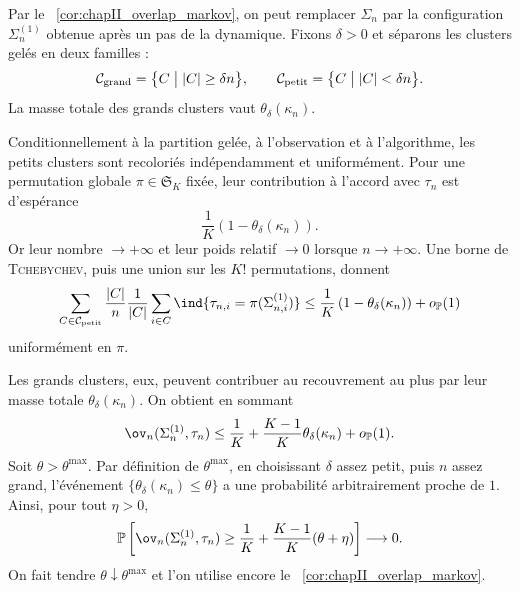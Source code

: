 \begin{Preuve}
Par le \Cor~\ref{cor:chapII_overlap_markov}, on peut remplacer $\Sigma_n$ par la configuration $\Sigma_n^{(1)}$ obtenue après un pas de la dynamique. Fixons $\delta>0$ et séparons les clusters gelés en deux familles :
\[
    \mathcal C_{\mathrm{grand}}=\bigl\{C \bigm| |C|\ge \delta n\bigr\},
    \qquad
    \mathcal C_{\mathrm{petit}}=\bigl\{C \bigm| |C|<\delta n\bigr\}.
\]
La masse totale des grands clusters vaut $\theta_\delta(\kappa_n)$.

Conditionnellement à la partition gelée, à l'observation et à l'algorithme, les petits clusters sont recoloriés indépendamment et uniformément. Pour une permutation globale $\pi\in\mathfrak S_K$ fixée, leur contribution à l'accord avec $\tau_n$ est d'espérance
\[
    \frac1K\left(1-\theta_\delta(\kappa_n)\right).
\]
Or leur nombre $\to +\infty$ et leur poids relatif $\to 0$ lorsque $n\to +\infty$.
Une borne de \textsc{Tchebychev}, puis une union sur les $K!$ permutations, donnent
\[
    \sum_{C\in\mathcal C_{\mathrm{petit}}}
    \frac{|C|}{n}
    \frac1{|C|}\sum_{i\in C}\ind{\tau_{n,i}=\pi(\Sigma_{n,i}^{(1)})}
    \le
    \frac1K\left(1-\theta_\delta(\kappa_n)\right)+o_{\mathbb P}(1)
\]
uniformément en $\pi$.

Les grands clusters, eux, peuvent contribuer au recouvrement au plus par leur masse totale $\theta_\delta(\kappa_n)$. On obtient en sommant
\[
    \ov_n(\Sigma_n^{(1)},\tau_n)
    \le
    \frac1K+\frac{K-1}{K}\theta_\delta(\kappa_n)
    +o_{\mathbb P}(1).
\]
Soit $\theta>\theta^{\max}$. Par définition de $\theta^{\max}$, en choisissant $\delta$ assez petit, puis $n$ assez grand, l'événement $\{\theta_\delta(\kappa_n)\le \theta\}$ a une probabilité arbitrairement proche de $1$. Ainsi, pour tout $\eta>0$,
\[
    \mathbb P\left[
        \ov_n(\Sigma_n^{(1)},\tau_n)
        \ge
        \frac1K+\frac{K-1}{K}(\theta+\eta)
    \right]\longrightarrow0.
\]
On fait tendre $\theta\downarrow\theta^{\max}$ et l'on utilise encore le \Cor~\ref{cor:chapII_overlap_markov}.
\end{Preuve}

